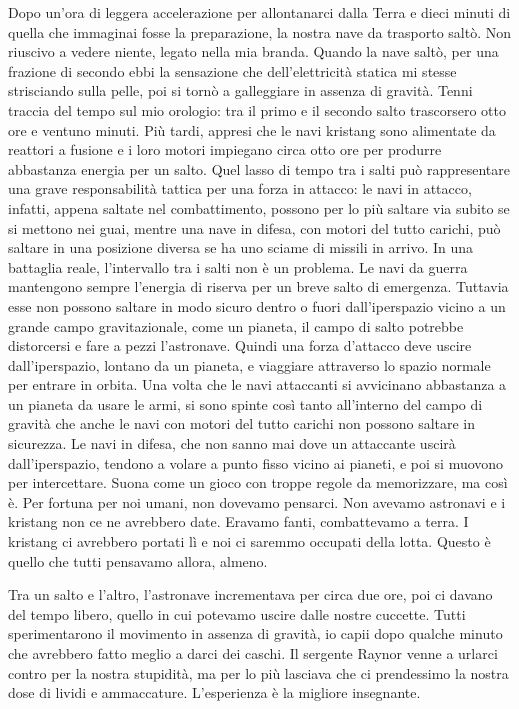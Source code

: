 Dopo un'ora di leggera accelerazione per allontanarci dalla Terra e
dieci minuti di quella che immaginai fosse la preparazione, la nostra
nave da trasporto saltò. Non riuscivo a vedere niente, legato nella mia
branda. Quando la nave saltò, per una frazione di secondo ebbi la
sensazione che dell'elettricità statica mi stesse strisciando sulla
pelle, poi si tornò a galleggiare in assenza di gravità. Tenni traccia
del tempo sul mio orologio: tra il primo e il secondo salto trascorsero
otto ore e ventuno minuti. Più tardi, appresi che le navi kristang sono
alimentate da reattori a fusione e i loro motori impiegano circa otto
ore per produrre abbastanza energia per un salto. Quel lasso di tempo
tra i salti può rappresentare una grave responsabilità tattica per una
forza in attacco: le navi in attacco, infatti, appena saltate nel
combattimento, possono per lo più saltare via subito se si mettono nei
guai, mentre una nave in difesa, con motori del tutto carichi, può
saltare in una posizione diversa se ha uno sciame di missili in arrivo.
In una battaglia reale, l'intervallo tra i salti non è un problema. Le
navi da guerra mantengono sempre l'energia di riserva per un breve salto
di emergenza. Tuttavia esse non possono saltare in modo sicuro dentro o
fuori dall'iperspazio vicino a un grande campo gravitazionale, come un
pianeta, il campo di salto potrebbe distorcersi e fare a pezzi
l'astronave. Quindi una forza d'attacco deve uscire dall'iperspazio,
lontano da un pianeta, e viaggiare attraverso lo spazio normale per
entrare in orbita. Una volta che le navi attaccanti si avvicinano
abbastanza a un pianeta da usare le armi, si sono spinte così tanto
all'interno del campo di gravità che anche le navi con motori del tutto
carichi non possono saltare in sicurezza. Le navi in difesa, che non
sanno mai dove un attaccante uscirà dall'iperspazio, tendono a volare a
punto fisso vicino ai pianeti, e poi si muovono per intercettare. Suona
come un gioco con troppe regole da memorizzare, ma così è. Per fortuna
per noi umani, non dovevamo pensarci. Non avevamo astronavi e i kristang
non ce ne avrebbero date. Eravamo fanti, combattevamo a terra. I
kristang ci avrebbero portati lì e noi ci saremmo occupati della lotta.
Questo è quello che tutti pensavamo allora, almeno.

Tra un salto e l'altro, l'astronave incrementava per circa due ore, poi
ci davano del tempo libero, quello in cui potevamo uscire dalle nostre
cuccette. Tutti sperimentarono il movimento in assenza di gravità, io
capii dopo qualche minuto che avrebbero fatto meglio a darci dei caschi.
Il sergente Raynor venne a urlarci contro per la nostra stupidità, ma
per lo più lasciava che ci prendessimo la nostra dose di lividi e
ammaccature. L'esperienza è la migliore insegnante.

